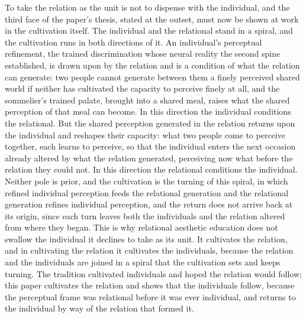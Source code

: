 To take the relation as the unit is not to dispense with the individual, and the third face of the paper's thesis, stated at the outset, must now be shown at work in the cultivation itself. The individual and the relational stand in a spiral, and the cultivation runs in both directions of it. An individual's perceptual refinement, the trained discrimination whose neural reality the second spine established, is drawn upon by the relation and is a condition of what the relation can generate: two people cannot generate between them a finely perceived shared world if neither has cultivated the capacity to perceive finely at all, and the sommelier's trained palate, brought into a shared meal, raises what the shared perception of that meal can become. In this direction the individual conditions the relational. But the shared perception generated in the relation returns upon the individual and reshapes their capacity: what two people come to perceive together, each learns to perceive, so that the individual enters the next occasion already altered by what the relation generated, perceiving now what before the relation they could not. In this direction the relational conditions the individual. Neither pole is prior, and the cultivation is the turning of this spiral, in which refined individual perception feeds the relational generation and the relational generation refines individual perception, and the return does not arrive back at its origin, since each turn leaves both the individuals and the relation altered from where they began. This is why relational aesthetic education does not swallow the individual it declines to take as its unit. It cultivates the relation, and in cultivating the relation it cultivates the individuals, because the relation and the individuals are joined in a spiral that the cultivation sets and keeps turning. The tradition cultivated individuals and hoped the relation would follow; this paper cultivates the relation and shows that the individuals follow, because the perceptual frame was relational before it was ever individual, and returns to the individual by way of the relation that formed it.
